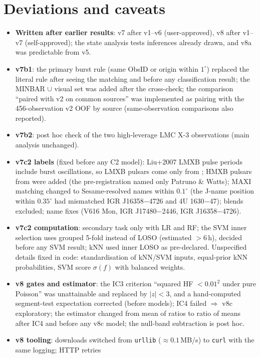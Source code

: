 \section{Deviations and caveats}\label{sec:p4caveats}
\begin{itemize}
\item \textbf{Written after earlier results}: v7 after v1--v6 (user-approved), v8 after v1--v7 (self-approved); the state analysis tests
inferences already drawn, and v8a was predictable from v5.
\item \textbf{v7b1}: the primary burst rule (same ObsID or origin within $1^\circ$) replaced the literal rule after seeing the matching and
before any classification result; the MINBAR $\cup$ visual set was added after the cross-check; the comparison ``paired with v2 on
common sources'' was implemented as pairing with the 456-observation v2 OOF by source (same-observation comparisons also reported).
\item \textbf{v7b2}: post hoc check of the two high-leverage LMC X-3 observations (main analysis unchanged).
\item \textbf{v7c2 labels} (fixed before any C2 model): Liu+2007 LMXB pulse periods include burst oscillations, so LMXB pulsars come only
from \citet{PatrunoWatts2021}; HMXB pulsars from \citet{Liu2006} were added (the pre-registration named only Patruno \& Watts);
MAXI matching changed to Sesame-resolved names within $0.1^\circ$ (the J-name position within $0.35^\circ$ had mismatched
IGR J16358$-$4726 and 4U 1630$-$47); blends excluded; name fixes (V616 Mon, IGR J17480$-$2446, IGR J16358$-$4726).
\item \textbf{v7c2 computation}: secondary task only with LR and RF; the SVM inner selection uses grouped 5-fold instead of LOSO (estimated
$>6$\,h), decided before any SVM result; kNN used inner LOSO as pre-declared. Unspecified details fixed in code: standardisation of
kNN/SVM inputs, equal-prior kNN probabilities, SVM score $\sigma(f)$ with balanced weights.
\item \textbf{v8 gates and estimator}: the IC3 criterion ``squared HF $<0.01^2$ under pure Poisson'' was unattainable and replaced by
$|z|<3$, and a hand-computed segment-test expectation corrected (before models); IC4 failed $\Rightarrow$ v8c exploratory; the estimator
changed from mean of ratios to ratio of means after IC4 and before any v8c model; the null-band subtraction is post hoc.
\item \textbf{v8 tooling}: downloads switched from \texttt{urllib} ($\approx0.1$\,MB/s) to \texttt{curl} with the same logging; HTTP retries

\end{itemize}
